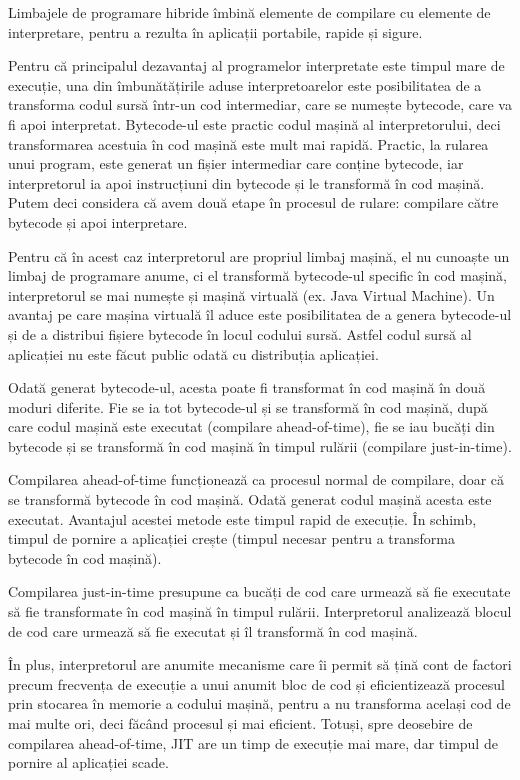 Limbajele de programare hibride îmbină elemente de compilare cu elemente de
interpretare, pentru a rezulta în aplicații portabile, rapide și sigure.

Pentru că principalul dezavantaj al programelor interpretate este timpul mare de
execuție, una din îmbunătățirile aduse interpretoarelor este posibilitatea de a
transforma codul sursă într-un cod intermediar, care se numește bytecode, care
va fi apoi interpretat. Bytecode-ul este practic codul mașină al
interpretorului, deci transformarea acestuia în cod mașină este mult mai rapidă.
Practic, la rularea unui program, este generat un fișier intermediar care
conține bytecode, iar interpretorul ia apoi instrucțiuni din bytecode și le
transformă în cod mașină. Putem deci considera că avem două etape în procesul de
rulare: compilare către bytecode și apoi interpretare.

Pentru că în acest caz interpretorul are propriul limbaj mașină, el nu cunoaște
un limbaj de programare anume, ci el transformă bytecode-ul specific în cod
mașină, interpretorul se mai numește și mașină virtuală (ex. Java Virtual
Machine). Un avantaj pe care mașina virtuală îl aduce este posibilitatea de a
genera bytecode-ul și de a distribui fișiere bytecode în locul codului sursă.
Astfel codul sursă al aplicației nu este făcut public odată cu distribuția
aplicației.

Odată generat bytecode-ul, acesta poate fi transformat în cod mașină în două
moduri diferite. Fie se ia tot bytecode-ul și se transformă în cod mașină, după
care codul mașină este executat (compilare ahead-of-time), fie se iau bucăți din
bytecode și se transformă în cod mașină în timpul rulării (compilare
just-in-time).

Compilarea ahead-of-time funcționează ca procesul normal de compilare, doar că
se transformă bytecode în cod mașină. Odată generat codul mașină acesta este
executat. Avantajul acestei metode este timpul rapid de execuție. În schimb,
timpul de pornire a aplicației crește (timpul necesar pentru a transforma
bytecode în cod mașină).

Compilarea just-in-time presupune ca bucăți de cod care urmează să fie executate
să fie transformate în cod mașină în timpul rulării. Interpretorul analizează
blocul de cod care urmează să fie executat și îl transformă în cod mașină.

În plus, interpretorul are anumite mecanisme care îi permit să țină cont de
factori precum frecvența de execuție a unui anumit bloc de cod și eficientizează
procesul prin stocarea în memorie a codului mașină, pentru a nu transforma
același cod de mai multe ori, deci făcând procesul și mai eficient. Totuși, spre
deosebire de compilarea ahead-of-time, JIT  are un
timp de execuție mai mare, dar timpul de pornire al aplicației scade.

